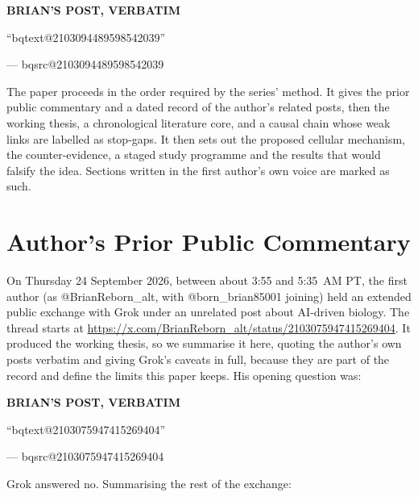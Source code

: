 \documentclass[11pt,a4paper]{article}
\makeatletter
\newcommand{\BQ}[1]{\begin{tcolorbox}[bqstyle]%
{\sffamily\bfseries\footnotesize\color{teal!80!black}BRIAN'S POST, VERBATIM}\par\smallskip
``\csname bqtext@#1\endcsname''\par\smallskip
{\raggedleft\footnotesize --- \csname bqsrc@#1\endcsname\par}\end{tcolorbox}}
\makeatother
\begin{document}
\BQ{2103094489598542039}

\noindent The paper proceeds in the order required by the series' method. It gives the prior public commentary and a dated record of the author's related posts, then the working thesis, a chronological literature core, and a causal chain whose weak links are labelled as stop-gaps. It then sets out the proposed cellular mechanism, the counter-evidence, a staged study programme and the results that would falsify the idea. Sections written in the first author's own voice are marked as such.

\section{Author's Prior Public Commentary}
\label{sec:commentary}

On Thursday 24 September 2026, between about 3:55 and 5:35~AM PT, the first author (as @BrianReborn\_alt, with @born\_brian85001 joining) held an extended public exchange with Grok under an unrelated post about AI-driven biology. The thread starts at \url{https://x.com/BrianReborn_alt/status/2103075947415269404}. It produced the working thesis, so we summarise it here, quoting the author's own posts verbatim and giving Grok's caveats in full, because they are part of the record and define the limits this paper keeps. His opening question was:

\BQ{2103075947415269404}

\noindent Grok answered no. Summarising the rest of the exchange:
\end{document}

